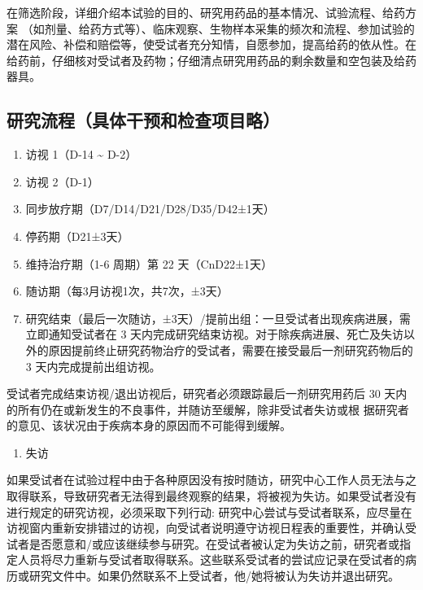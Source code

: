 \documentclass[
  chinese-hans,
  letterpaper,
  DIV=11,
  numbers=noendperiod]{scrreprt}
\providecommand{\tightlist}{%
  \setlength{\itemsep}{0pt}\setlength{\parskip}{0pt}}
\begin{document}
在筛选阶段，详细介绍本试验的目的、研究用药品的基本情况、试验流程、给药方案
（如剂量、给药方式等）、临床观察、生物样本采集的频次和流程、参加试验的潜在风险、补偿和赔偿等，使受试者充分知情，自愿参加，提高给药的依从性。在给药前，仔细核对受试者及药物；仔细清点研究用药品的剩余数量和空包装及给药器具。

\subsection{研究流程（具体干预和检查项目略）}\label{ux7814ux7a76ux6d41ux7a0bux5177ux4f53ux5e72ux9884ux548cux68c0ux67e5ux9879ux76eeux7565}

\begin{enumerate}
\def\labelenumi{\arabic{enumi}.}
\item
  访视 1（D-14 \textasciitilde{} D-2）
\item
  访视 2（D-1）
\item
  同步放疗期（D7/D14/D21/D28/D35/D42±1天）
\item
  停药期（D21±3天）
\item
  维持治疗期（1-6 周期）第 22 天（CnD22±1天）
\item
  随访期（每3月访视1次，共7次，±3天）
\item
  研究结束（最后一次随访，±3天）/提前出组：一旦受试者出现疾病进展，需立即通知受试者在
  3
  天内完成研究结束访视。对于除疾病进展、死亡及失访以外的原因提前终止研究药物治疗的受试者，需要在接受最后一剂研究药物后的
  3 天内完成提前出组访视。
\end{enumerate}

受试者完成结束访视/退出访视后，研究者必须跟踪最后一剂研究用药后 30
天内的所有仍在或新发生的不良事件，并随访至缓解，除非受试者失访或根
据研究者的意见、该状况由于疾病本身的原因而不可能得到缓解。

\begin{enumerate}
\def\labelenumi{\arabic{enumi}.}
\setcounter{enumi}{7}
\tightlist
\item
  失访
\end{enumerate}

如果受试者在试验过程中由于各种原因没有按时随访，研究中心工作人员无法与之取得联系，导致研究者无法得到最终观察的结果，将被视为失访。如果受试者没有进行规定的研究访视，必须采取下列行动:
研究中心尝试与受试者联系，应尽量在访视窗内重新安排错过的访视，向受试者说明遵守访视日程表的重要性，并确认受试者是否愿意和/或应该继续参与研究。在受试者被认定为失访之前，研究者或指定人员将尽力重新与受试者取得联系。这些联系受试者的尝试应记录在受试者的病历或研究文件中。如果仍然联系不上受试者，他/她将被认为失访并退出研究。
\end{document}

